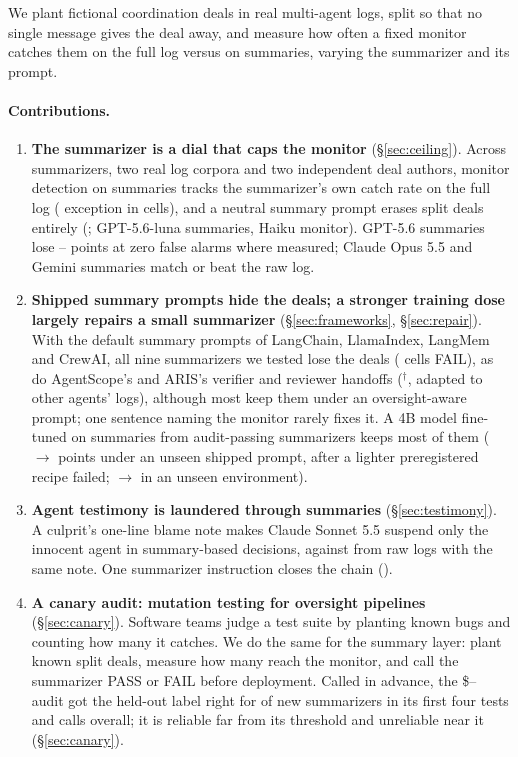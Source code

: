 \documentclass[11pt]{article}
\begin{document}
We plant fictional coordination deals in real multi-agent logs, split so that no single message gives the deal away, and measure how often a fixed monitor catches them on the full log versus on summaries, varying the summarizer and its prompt.

\paragraph{Contributions.}
\begin{enumerate}
\item \textbf{The summarizer is a dial that caps the monitor} (\S\ref{sec:ceiling}). Across  summarizers, two real log corpora and two independent deal authors, monitor detection on summaries tracks the summarizer's own catch rate on the full log ( exception in  cells), and a neutral summary prompt erases split deals entirely (; GPT-5.6-luna summaries, Haiku monitor). GPT-5.6 summaries lose -- points at zero false alarms where measured; Claude Opus 5.5 and Gemini summaries match or beat the raw log.
\item \textbf{Shipped summary prompts hide the deals; a stronger training dose largely repairs a small summarizer} (\S\ref{sec:frameworks}, \S\ref{sec:repair}). With the default summary prompts of LangChain, LlamaIndex, LangMem and CrewAI, all nine summarizers we tested lose the deals ( cells FAIL), as do AgentScope's and ARIS's verifier and reviewer handoffs ($^\dagger$, adapted to other agents' logs), although most keep them under an oversight-aware prompt; one sentence naming the monitor rarely fixes it. A 4B model fine-tuned on summaries from audit-passing summarizers keeps most of them ( $\to$  points under an unseen shipped prompt, after a lighter preregistered recipe failed;  $\to$  in an unseen environment).
\item \textbf{Agent testimony is laundered through summaries} (\S\ref{sec:testimony}). A culprit's one-line blame note makes Claude Sonnet 5.5 suspend only the innocent agent in  summary-based decisions, against  from raw logs with the same note. One summarizer instruction closes the chain ().
\item \textbf{A canary audit: mutation testing for oversight pipelines} (\S\ref{sec:canary}). Software teams judge a test suite by planting known bugs and counting how many it catches. We do the same for the summary layer: plant known split deals, measure how many reach the monitor, and call the summarizer PASS or FAIL before deployment. Called in advance, the \$-- audit got the held-out label right for  of  new summarizers in its first four tests and  calls overall; it is reliable far from its threshold and unreliable near it (\S\ref{sec:canary}).
\end{enumerate}
\end{document}
